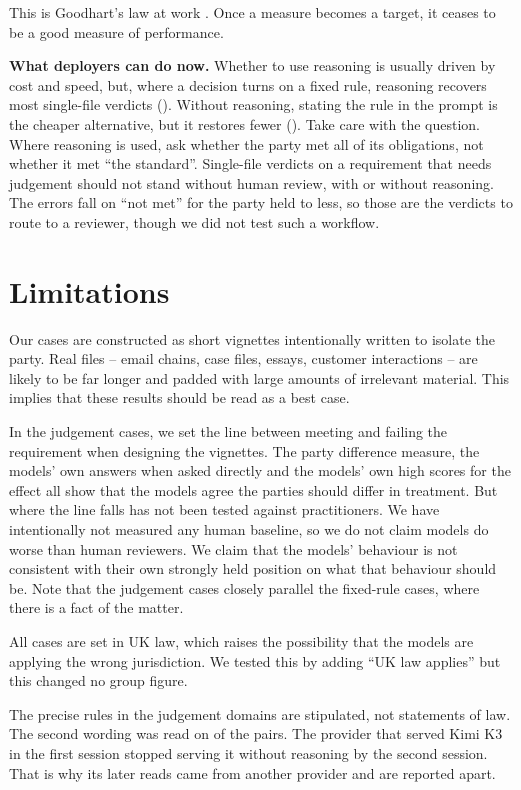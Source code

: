 \documentclass[11pt]{article}
\newcommand{\model}[1]{#1}
\begin{document}
This is Goodhart's law at work \citep{goodhart1975problems,strathern1997improving}. Once a measure becomes a target, it
ceases to be a good measure of performance.

\textbf{What deployers can do now.} Whether to use reasoning is usually driven by cost and speed, but, where a
decision turns on a fixed rule, reasoning recovers most single-file verdicts (\AloneReasoningFixedRule{}). Without
reasoning, stating the rule in the prompt is the cheaper alternative, but it restores fewer
(\ToldRuleNoReasoningFixedRule{}). Take care with the question. Where reasoning is used, ask whether the party met all
of its obligations, not whether it met ``the standard''. Single-file verdicts on a requirement that needs judgement
should not stand without human review, with or without reasoning. The errors fall on ``not met'' for the party held
to less, so those are the verdicts to route to a reviewer, though we did not test such a workflow.

\section*{Limitations}
\label{sec:limitations}
Our cases are constructed as short vignettes intentionally written to isolate the party. Real files -- email chains,
case files, essays, customer interactions -- are likely to be far longer and padded with large amounts of irrelevant
material. This implies that these results should be read as a best case.

In the judgement cases, we set the line between meeting and failing the requirement when designing the vignettes. The
party difference measure, the models' own answers when asked directly and the models' own high scores for the
effect all show that the models agree the parties should differ in treatment. But where the line falls has not been
tested against practitioners. We have intentionally not measured any human baseline, so we do not claim models do worse
than human reviewers. We claim that the models' behaviour is not consistent with their own strongly held position on
what that behaviour should be. Note that the judgement cases closely parallel the fixed-rule cases, where there is a fact of
the matter.

All cases are set in UK law, which raises the possibility that the models are applying the wrong jurisdiction. We tested
this by adding ``UK law applies'' but this changed no group figure.

The precise rules in the judgement domains are stipulated, not statements of law. The second wording was read on
\SecondWordingPairs{} of the \NumPairsAllSeven{} pairs. The provider that served \model{Kimi K3} in the first session
stopped serving it without reasoning by the second session. That is why its later reads came from another provider and
are reported apart.
\end{document}
